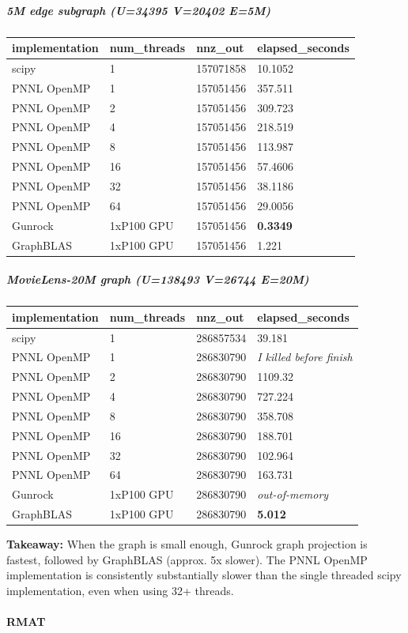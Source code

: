 \documentclass[10pt,oneside]{memoir}
\let\oldparagraph\paragraph
\renewcommand{\paragraph}[1]{\oldparagraph{#1}\mbox{}}
\let\oldsubparagraph\subparagraph
\renewcommand{\subparagraph}[1]{\oldsubparagraph{#1}\mbox{}}
\begin{document}
\hypertarget{m-edge-subgraph-u34395-v20402-e5m}{%
\subparagraph{5M edge subgraph (\textbar{}U\textbar{}=34395
\textbar{}V\textbar{}=20402
\textbar{}E\textbar{}=5M)}\label{m-edge-subgraph-u34395-v20402-e5m}}

\begin{longtable}[]{@{}llll@{}}
\toprule
implementation & num\_threads & nnz\_out &
elapsed\_seconds\tabularnewline
\midrule
\endhead
scipy & 1 & 157071858 & 10.1052\tabularnewline
PNNL OpenMP & 1 & 157051456 & 357.511\tabularnewline
PNNL OpenMP & 2 & 157051456 & 309.723\tabularnewline
PNNL OpenMP & 4 & 157051456 & 218.519\tabularnewline
PNNL OpenMP & 8 & 157051456 & 113.987\tabularnewline
PNNL OpenMP & 16 & 157051456 & 57.4606\tabularnewline
PNNL OpenMP & 32 & 157051456 & 38.1186\tabularnewline
PNNL OpenMP & 64 & 157051456 & 29.0056\tabularnewline
Gunrock & 1xP100 GPU & 157051456 & \textbf{0.3349}\tabularnewline
GraphBLAS & 1xP100 GPU & 157051456 & 1.221\tabularnewline
\bottomrule
\end{longtable}

\hypertarget{movielens-20m-graph-u138493-v26744-e20m}{%
\subparagraph{MovieLens-20M graph (\textbar{}U\textbar{}=138493
\textbar{}V\textbar{}=26744
\textbar{}E\textbar{}=20M)}\label{movielens-20m-graph-u138493-v26744-e20m}}

\begin{longtable}[]{@{}llll@{}}
\toprule
implementation & num\_threads & nnz\_out &
elapsed\_seconds\tabularnewline
\midrule
\endhead
scipy & 1 & 286857534 & 39.181\tabularnewline
PNNL OpenMP & 1 & 286830790 & \emph{I killed before
finish}\tabularnewline
PNNL OpenMP & 2 & 286830790 & 1109.32\tabularnewline
PNNL OpenMP & 4 & 286830790 & 727.224\tabularnewline
PNNL OpenMP & 8 & 286830790 & 358.708\tabularnewline
PNNL OpenMP & 16 & 286830790 & 188.701\tabularnewline
PNNL OpenMP & 32 & 286830790 & 102.964\tabularnewline
PNNL OpenMP & 64 & 286830790 & 163.731\tabularnewline
Gunrock & 1xP100 GPU & 286830790 & \emph{out-of-memory}\tabularnewline
GraphBLAS & 1xP100 GPU & 286830790 & \textbf{5.012}\tabularnewline
\bottomrule
\end{longtable}

\textbf{Takeaway:} When the graph is small enough, Gunrock graph
projection is fastest, followed by GraphBLAS (approx. 5x slower). The
PNNL OpenMP implementation is consistently substantially slower than the
single threaded scipy implementation, even when using 32+ threads.

\hypertarget{rmat}{%
\paragraph{RMAT}\label{rmat}}
\end{document}
